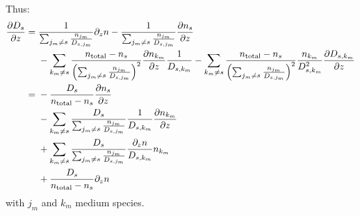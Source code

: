 Thus:
\begin{equation}
\begin{split}
\frac{\partial D_s}{\partial z} = &\;   \frac{1}{\sum_{j_m \neq s}\frac{n_{j_m}}{D_{s,j_m}}}\partial_{z}{n} 
                        - \frac{1}{\sum_{j_m \neq s}\frac{n_{j_m}}{D_{s,j_m}}}\frac{\partial n_s}{\partial z} \\
                    &\; - \sum_{k_m\neq s}\frac{n_\text{total} - n_s}{\left(\sum_{j_m \neq s}\frac{n_{j_m}}{D_{s,j_m}}\right)^2}
                                \frac{\partial n_{k_m}}{\partial z}\frac{1}{D_{s,k_m}} 
                        -  \sum_{k_m\neq s}\frac{n_\text{total} - n_s}{\left(\sum_{j_m \neq s}\frac{n_{j_m}}{D_{s,j_m}}\right)^2} 
                                \frac{n_{k_m}}{D_{s,k_m}^2}\frac{\partial D_{s,k_m}}{\partial z}\\
                  = &\; - \frac{D_s}{n_\text{total} - n_s}\frac{\partial n_s}{\partial z} \\
                    &\; - \sum_{k_m\neq s}\frac{D_s}{\sum_{j_m \neq s}\frac{n_{j_m}}{D_{s,j_m}}}
                                \frac{1}{D_{s,k_m}} \frac{\partial n_{k_m}}{\partial z} \\
                    &\; +  \sum_{k_m\neq s}\frac{D_s}{\sum_{j_m \neq s}\frac{n_{j_m}}{D_{s,j_m}}} 
                                \frac{\partial_{z}{n}}{D_{s,k_m}}n_{k_m} \\
                    &\; + \frac{D_s}{n_\text{total} - n_s}\partial_{z}{n} \\
\end{split}
\label{Titan:dDs_dz}
\end{equation}
with $j_m$ and $k_m$ medium species.

